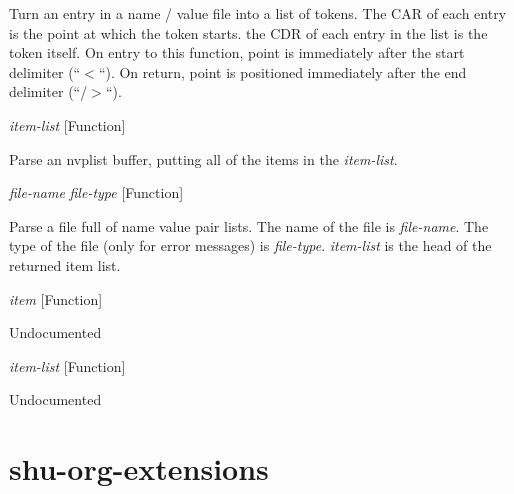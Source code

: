 \begin{doc-string}
Turn an entry in a name / value file into a list of tokens.  The CAR of each entry is the point
at which the token starts.  the CDR of each entry in the list is the token itself.  On entry
to this function, point is immediately after the start delimiter (``$<$``).  On return, point
is positioned immediately after the end delimiter (``/$>$``).
\end{doc-string}

\vspace{1em}
\noindent
{}
\usebox{\funcname}\emph{item-list}
 \hfill [Function]

\begin{doc-string}
Parse an nvplist buffer, putting all of the items in the \emph{item-list}.
\end{doc-string}

\vspace{1em}
\noindent
{}
\usebox{\funcname}\emph{file-name} \emph{file-type}
 \hfill [Function]
\hspace*{\wd\funcname}

\begin{doc-string}
Parse a file full of name value pair lists.  The name of the file is \emph{file-name}.
The type of the file (only for error messages) is \emph{file-type}.  \emph{item-list} is the head
of the returned item list.
\end{doc-string}

\vspace{1em}
\noindent
{}
\usebox{\funcname}\emph{item}
 \hfill [Function]

\begin{doc-string}
Undocumented
\end{doc-string}

\vspace{1em}
\noindent
{}
\usebox{\funcname}\emph{item-list}
 \hfill [Function]

\begin{doc-string}
Undocumented
\end{doc-string}

\eject
\section{shu-org-extensions}


